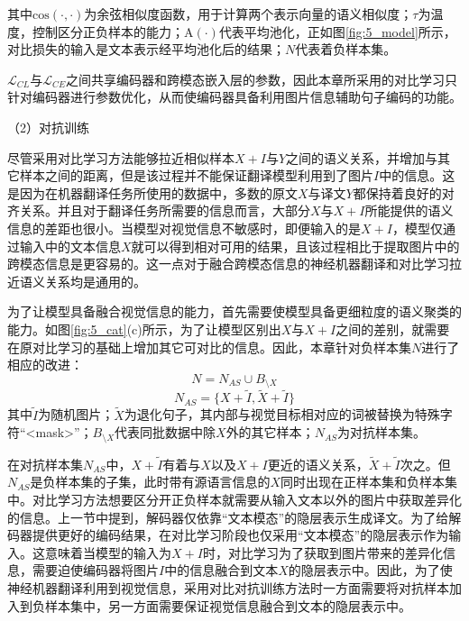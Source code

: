 其中$\mathrm{cos}(\cdot,\cdot)$为余弦相似度函数，用于计算两个表示向量的语义相似度；$\tau$为温度，控制区分正负样本的能力；$\mathrm{A}(\cdot)$代表平均池化，正如图\ref{fig:5_model}所示，对比损失的输入是文本表示经平均池化后的结果；$N$代表着负样本集。

$\mathcal{L}_{CL}$与$\mathcal{L}_{CE}$之间共享编码器和跨模态嵌入层的参数，因此本章所采用的对比学习只针对编码器进行参数优化，从而使编码器具备利用图片信息辅助句子编码的功能。

{\sffamily （2）对抗训练}

尽管采用对比学习方法能够拉近相似样本$X+I$与$Y$之间的语义关系，并增加与其它样本之间的距离，但是该过程并不能保证翻译模型利用到了图片$I$中的信息。这是因为在机器翻译任务所使用的数据中，多数的原文$X$与译文$Y$都保持着良好的对齐关系。并且对于翻译任务所需要的信息而言，大部分$X$与$X+I$所能提供的语义信息的差距也很小。当模型对视觉信息不敏感时，即便输入的是$X+I$，模型仅通过输入中的文本信息$X$就可以得到相对可用的结果，且该过程相比于提取图片中的跨模态信息是更容易的。这一点对于融合跨模态信息的神经机器翻译和对比学习拉近语义关系均是通用的。

为了让模型具备融合视觉信息的能力，首先需要使模型具备更细粒度的语义聚类的能力。如图\ref{fig:5_cat}(c)所示，为了让模型区别出$X$与$X+I$之间的差别，就需要在原对比学习的基础上增加其它可对比的信息。因此，本章针对负样本集$N$进行了相应的改进：
\begin{equation}
    N=N_{AS}\cup B_{\setminus X}
    \label{eq:5_negative_sample_set}
\end{equation}
\begin{equation}
    N_{AS}=\{X+\tilde{I},\tilde{X}+\tilde{I}\}
    \label{eq:5_adversarial_sample_set}
\end{equation}
其中$\tilde{I}$为随机图片；$\tilde{X}$为退化句子，其内部与视觉目标相对应的词被替换为特殊字符“<mask>”；$B_{\setminus X}$代表同批数据中除$X$外的其它样本；$N_{AS}$为对抗样本集。

在对抗样本集$N_{AS}$中，$X+\tilde{I}$有着与$X$以及$X+I$更近的语义关系，$\tilde{X}+\tilde{I}$次之。但$N_{AS}$是负样本集的子集，此时带有源语言信息的$X$同时出现在正样本集和负样本集中。对比学习方法想要区分开正负样本就需要从输入文本以外的图片中获取差异化的信息。上一节中提到，解码器仅依靠“文本模态”的隐层表示生成译文。为了给解码器提供更好的编码结果，在对比学习阶段也仅采用“文本模态”的隐层表示作为输入。这意味着当模型的输入为$X+I$时，对比学习为了获取到图片带来的差异化信息，需要迫使编码器将图片$I$中的信息融合到文本$X$的隐层表示中。因此，为了使神经机器翻译利用到视觉信息，采用对比对抗训练方法时一方面需要将对抗样本加入到负样本集中，另一方面需要保证视觉信息融合到文本的隐层表示中。

